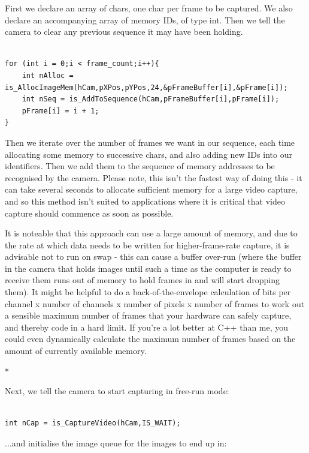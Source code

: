 \documentclass[12pt,a4paper]{article}
\begin{document}
First we declare an array of chars, one char per frame to be captured. We also declare an accompanying array of memory IDs, of type int. Then we tell the camera to clear any previous sequence it may have been holding.

\lstset{language=C++}
\begin{lstlisting}

for (int i = 0;i < frame_count;i++){
	int nAlloc = is_AllocImageMem(hCam,pXPos,pYPos,24,&pFrameBuffer[i],&pFrame[i]);
	int nSeq = is_AddToSequence(hCam,pFrameBuffer[i],pFrame[i]);
	pFrame[i] = i + 1;
}

\end{lstlisting}

Then we iterate over the number of frames we want in our sequence, each time allocating some memory to successive chars, and also adding new IDs into our identifiers. Then we add them to the sequence of memory addresses to be recognised by the camera. Please note, this isn't the fastest way of doing this - it can take several seconds to allocate sufficient memory for a large video capture, and so this method isn't suited to applications where it is critical that video capture should commence as soon as possible.

It is noteable that this approach can use a large amount of memory, and due to the rate at which data needs to be written for higher-frame-rate capture, it is advisable not to run on swap - this can cause a buffer over-run (where the buffer in the camera that holds images until such a time as the computer is ready to receive them runs out of memory to hold frames in and will start dropping them). It might be helpful to do a back-of-the-envelope calculation of bits per channel x number of channels x number of pixels x number of frames to work out a sensible maximum number of frames that your hardware can safely capture, and thereby code in a hard limit. If you're a lot better at C++ than me, you could even dynamically calculate the maximum number of frames based on the amount of currently available memory.

*

Next, we tell the camera to start capturing in free-run mode:

\lstset{language=C++}
\begin{lstlisting}

int nCap = is_CaptureVideo(hCam,IS_WAIT);

\end{lstlisting}

...and initialise the image queue for the images to end up in:
\end{document}
